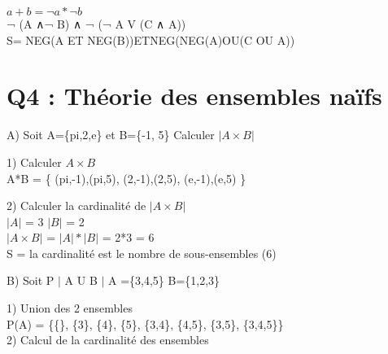   $a+b = ¬ a * ¬ b$\\

  ¬ (A ∧¬ B) ∧ ¬ (¬ A V (C ∧ A)) \\

  S= NEG(A ET NEG(B))ETNEG(NEG(A)OU(C OU A)) \\


\vspace{10mm} %

\section{Q4 : Théorie des ensembles naïfs}

\vspace{4mm} %

A) Soit A=\{pi,2,e\} et B=\{-1, 5\} Calculer ${|A\times B|}$ \\

\vspace{4mm} %

  1) Calculer ${A\times B}$ \\

  A*B = \{ (pi,-1),(pi,5), (2,-1),(2,5), (e,-1),(e,5) \}

  \vspace{8mm} %

    2) Calculer la cardinalité de ${|A\times B|}$ \\

      ${|A|}$ = 3  ${|B|}$ = 2 \\

      ${|A\times B|}$ = ${|A|}*{|B|}$ = 2*3 = 6 \\

      S = la cardinalité est le nombre de sous-ensembles (6)\\

  \vspace{8mm} %

  B) Soit P $|$ A U B $|$ A =\{3,4,5\} B=\{1,2,3\} \\

  \vspace{5mm} %

  1) Union des 2 ensembles \\

  P(A) = \{\{\}, \{3\}, \{4\}, \{5\}, \{3,4\}, \{4,5\}, \{3,5\}, \{3,4,5\}\} \\

  \vspace{4mm} %
  2) Calcul de la cardinalité des ensembles \\


